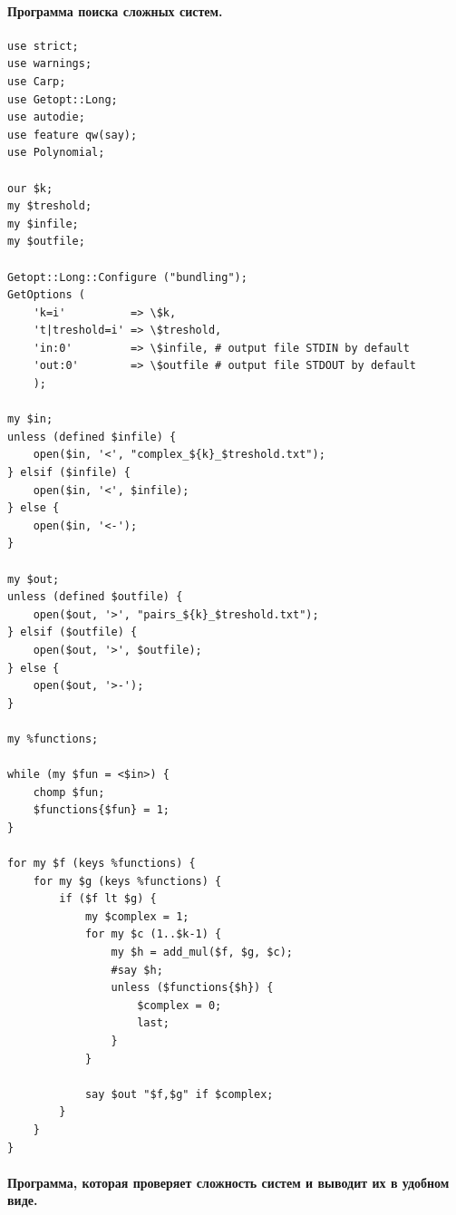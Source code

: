 \documentclass[bibliography=totoc, a4paper, 12pt]{extarticle}
\begin{document}
\paragraph{Программа поиска сложных систем.}

\begin{verbatim}
use strict;
use warnings;
use Carp;
use Getopt::Long;
use autodie;
use feature qw(say);
use Polynomial;

our $k;
my $treshold;
my $infile;
my $outfile;

Getopt::Long::Configure ("bundling");
GetOptions (
    'k=i'          => \$k,
    't|treshold=i' => \$treshold,
    'in:0'         => \$infile, # output file STDIN by default
    'out:0'        => \$outfile # output file STDOUT by default
    );

my $in;
unless (defined $infile) {
    open($in, '<', "complex_${k}_$treshold.txt");
} elsif ($infile) {
    open($in, '<', $infile);
} else {
    open($in, '<-');
}

my $out;
unless (defined $outfile) {
    open($out, '>', "pairs_${k}_$treshold.txt");
} elsif ($outfile) {
    open($out, '>', $outfile);
} else {
    open($out, '>-');
}

my %functions;

while (my $fun = <$in>) {
    chomp $fun;
    $functions{$fun} = 1;
}

for my $f (keys %functions) {
    for my $g (keys %functions) {
        if ($f lt $g) {
            my $complex = 1;
            for my $c (1..$k-1) {
                my $h = add_mul($f, $g, $c);
                #say $h;
                unless ($functions{$h}) {
                    $complex = 0;
                    last;
                }
            }

            say $out "$f,$g" if $complex;
        }
    }
}
\end{verbatim}


\paragraph{Программа, которая проверяет сложность систем и выводит их в удобном
виде.}
\end{document}
